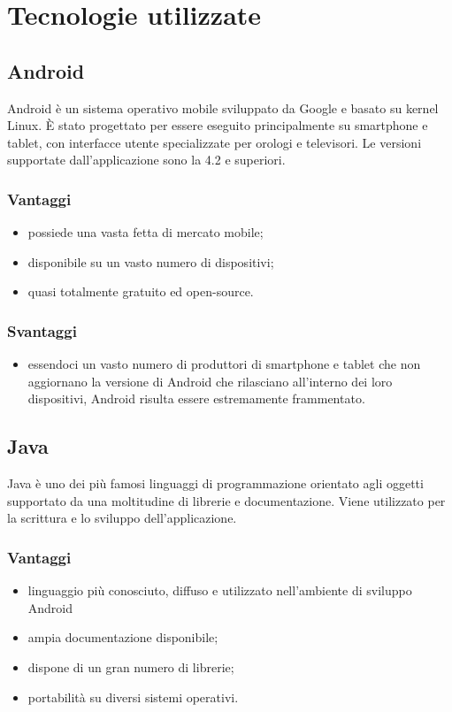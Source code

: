 \documentclass[../Tesi.tex]{subfiles}
\begin{document}
\section{Tecnologie utilizzate}
	
	\subsection{Android}
		Android è un sistema operativo mobile sviluppato da Google e basato su kernel Linux. È stato progettato per essere eseguito principalmente su smartphone e tablet, con interfacce utente specializzate per orologi e televisori. Le versioni supportate dall'applicazione sono la 4.2 e superiori.
		\subsubsection{Vantaggi}
			\begin{itemize}
				\item possiede una vasta fetta di mercato mobile;
				\item disponibile su un vasto numero di dispositivi;
				\item quasi totalmente gratuito ed open-source.
			\end{itemize}
		\subsubsection{Svantaggi}
			\begin{itemize}
				\item essendoci un vasto numero di produttori di smartphone e tablet che non aggiornano la versione di Android che rilasciano all'interno dei loro dispositivi, Android risulta essere estremamente frammentato.
			\end{itemize}
			
	\subsection{Java}
		Java è uno dei più famosi linguaggi di programmazione orientato agli oggetti supportato da una moltitudine di librerie e documentazione. Viene utilizzato per la scrittura e lo sviluppo dell'applicazione.
		\subsubsection{Vantaggi}
			\begin{itemize}
				\item linguaggio più conosciuto, diffuso e utilizzato nell'ambiente di sviluppo Android
				\item ampia documentazione disponibile;
				\item dispone di un gran numero di librerie;
				\item portabilità su diversi sistemi operativi.
			\end{itemize}
\end{document}
